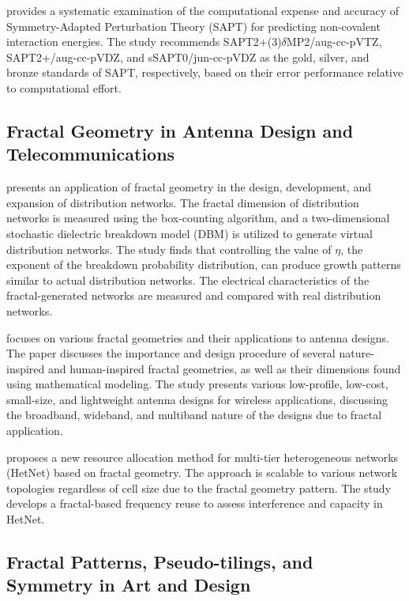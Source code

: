 \documentclass{article}
\begin{document}
\cite{Parker2014LevelsOS} provides a systematic examination of the computational expense and accuracy of Symmetry-Adapted Perturbation Theory (SAPT) for predicting non-covalent interaction energies. The study recommends SAPT2+(3)$\delta$MP2/aug-cc-pVTZ, SAPT2+/aug-cc-pVDZ, and sSAPT0/jun-cc-pVDZ as the gold, silver, and bronze standards of SAPT, respectively, based on their error performance relative to computational effort.

\subsection{Fractal Geometry in Antenna Design and Telecommunications}

\cite{Barakou2015FractalGF} presents an application of fractal geometry in the design, development, and expansion of distribution networks. The fractal dimension of distribution networks is measured using the box-counting algorithm, and a two-dimensional stochastic dielectric breakdown model (DBM) is utilized to generate virtual distribution networks. The study finds that controlling the value of $\eta$, the exponent of the breakdown probability distribution, can produce growth patterns similar to actual distribution networks. The electrical characteristics of the fractal-generated networks are measured and compared with real distribution networks.

\cite{Jena2019FractalGA} focuses on various fractal geometries and their applications to antenna designs. The paper discusses the importance and design procedure of several nature-inspired and human-inspired fractal geometries, as well as their dimensions found using mathematical modeling. The study presents various low-profile, low-cost, small-size, and lightweight antenna designs for wireless applications, discussing the broadband, wideband, and multiband nature of the designs due to fractal application.

\cite{Maksymyuk2015FractalGB} proposes a new resource allocation method for multi-tier heterogeneous networks (HetNet) based on fractal geometry. The approach is scalable to various network topologies regardless of cell size due to the fractal geometry pattern. The study develops a fractal-based frequency reuse to assess interference and capacity in HetNet.

\subsection{Fractal Patterns, Pseudo-tilings, and Symmetry in Art and Design}
\end{document}
